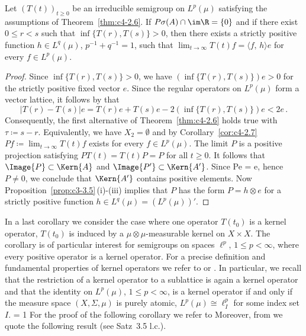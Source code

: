 \begin{corollary}\label{cor:c4-2.10}
%
%
Let $(T(t))_{t\geq 0}$ be an irreducible semigroup on $L^{p}(\mu)$ satisfying the assumptions of Theorem~\ref{thm:c4-2.6}.
If\/ $P{\sigma}(A) \cap \im\R = \{0\}$ and if there exist $0 \leq r < s$ such that $\inf\{T(r),T(s)\} > 0$, then there exists a strictly positive function $h \in L^{q}(\mu)$, $p^{-1}+q^{-1} = 1$, such that $\lim_{t \to \infty} T(t)f = \langle f,\,h \rangle e$ for every $f \in L^{p}(\mu)$.
\end{corollary}
\begin{proof}
Since $\inf\{T(r),T(s)\} > 0$, we have $(\inf\{T(r),T(s)\})e > 0$ for the strictly positive fixed vector $e$.
Since the regular operators on $L^{p}(\mu)$ form a vector lattice, it follows by \textcite[II.1.4, Formula (5) \& (5')]{schaefer:1974} that 
\[
|T(r) - T(s)|e = T(r)e + T(s)e - 2(\inf\{T(r),T(s)\})e < 2e\,.
\]
Consequently, the first alternative of Theorem~\ref{thm:c4-2.6} holds true with $\tau \coloneqq s-r$.
Equivalently, we have $X_{2} = \emptyset$ and by Corollary~\ref{cor:c4-2.7} $Pf \coloneqq \lim_{t \to \infty} T(t)f$ exists for every $f \in L^{p}(\mu)$.
The limit $P$ is a positive projection satisfying $PT(t) = T(t)P = P$ for all $t \geq 0$.
It follows that $\Image{P} \subset \Kern{A}$ and $\Image{P'} \subset \Kern{A'}$.
Since Pe = e, hence $P \neq 0$, we conclude that $\Kern{A'}$ contains positive elements.
Now Proposition~\ref{prop:c3-3.5}\,(i)-(iii) implies that $P$ has the form $P = h \otimes e$ for a strictly positive function $h \in L^{q}(\mu) = (L^{p}(\mu))'$.
\end{proof}
In a last corollary we consider the case where one operator $T(t_{0})$ is a kernel operator, \ie  $T(t_{0})$ is induced by a $\mu \otimes \mu$-measurable kernel on $X \times X$.
The corollary is of particular interest for semigroups on spaces $\ell^{p}$, $1 \leq p < \infty$, where every positive operator is a kernel operator.
For a precise definition and fundamental properties of kernel operators we refer to \textcite[Section IV.9]{schaefer:1974} or \textcite[Chapter 13]{zaanen:1983}.
In particular, we recall that the restriction of a kernel operator to a sublattice is again a kernel operator and that
the identity on $L^{p}(\mu)$, $1 \leq p < \infty$, is a kernel operator if and only if the measure space $(X,\Sigma,\mu)$ is purely atomic, \ie  $L^{p}(\mu) \cong \ell^{p}_{I}$ for some index set $I$.
 = 1 
For the proof of the following corollary we refer to 
\textcite[Theorem 1]{gerlach:2017}
\fi
Moreover, from  \textcite{axmann:1980} we quote the following result (see Satz~3.5 l.c.).

